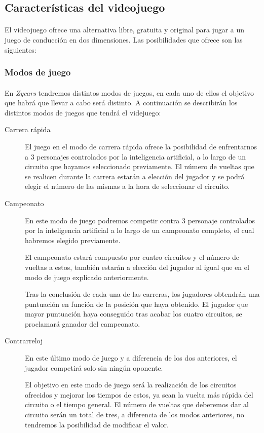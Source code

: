 \documentclass[a4paper,11pt]{article} %
\begin{document}
\subsection{Características del videojuego}

\paragraph{}
El videojuego ofrece una alternativa libre, gratuita y original para jugar a un juego de conducción en dos dimensiones. 
Las posibilidades que ofrece son las siguientes:

\subsubsection{Modos de juego}

\paragraph{}
En \emph{Zycars} tendremos distintos modos de juegos, en cada uno de ellos el
objetivo que habrá que llevar a cabo será distinto.
A continuación se describirán los distintos modos de juegos que tendrá el videjuego:

\begin{description}

\item[Carrera rápida]
El juego en el modo de carrera rápida ofrece la posibilidad de enfrentarnos a 3 personajes 
controlados por la inteligencia artificial, a lo largo de un circuito que
hayamos seleccionado previamente. El número de vueltas
que se realicen durante la carrera estarán a elección del jugador y se podrá elegir el número de las mismas a la hora de seleccionar
el circuito.

\item[Campeonato]
En este modo de juego podremos competir contra 3 personaje controlados por la inteligencia artificial 
a lo largo de un campeonato completo, el cual habremos elegido previamente. 

El campeonato estará compuesto por cuatro circuitos y el número de vueltas a estos, también estarán a elección del jugador 
al igual que en el modo de juego explicado anteriormente.

Tras la conclusión de cada una de las carreras, los jugadores obtendrán una puntuación en función de la posición que haya 
obtenido. El jugador que mayor puntuación haya conseguido tras acabar los cuatro circuitos, se proclamará ganador del 
campeonato.

\item[Contrarreloj]
En este último modo de juego y a diferencia de los dos anteriores, el jugador competirá solo sin ningún oponente.

El objetivo en este modo de juego será la realización de los circuitos ofrecidos y mejorar los tiempos de estos, ya sean la 
vuelta más rápida del circuito o el tiempo general. El número de vueltas que deberemos dar al circuito serán un total de tres, a
diferencia de los modos anteriores, no tendremos la posibilidad de modificar el valor.

\end{description}
\end{document}

